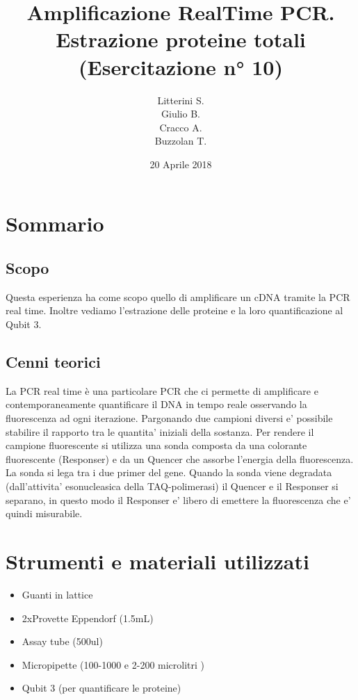 \documentclass{article}
\title{Amplificazione RealTime PCR. Estrazione proteine totali \\ (Esercitazione n° 10)} %
\author{Litterini S. \\Giulio B. \\Cracco A.\\Buzzolan T. } %
\date{20 Aprile 2018} %
\begin{document}
\maketitle


\section{Sommario}

\subsection{Scopo}


Questa esperienza ha come scopo quello di amplificare un cDNA tramite la PCR real time. Inoltre vediamo l'estrazione delle proteine e la loro quantificazione al Qubit 3.


\subsection{Cenni teorici}

La PCR real time è una particolare PCR che ci permette di amplificare e
contemporaneamente quantificare il DNA in tempo reale osservando la fluorescenza ad ogni iterazione.
Pargonando due campioni diversi e' possibile stabilire il rapporto tra le quantita' iniziali della sostanza.
Per rendere il campione fluorescente si utilizza una sonda composta da una colorante
fluorescente (Responser) e da un Quencer che assorbe l'energia della fluorescenza.
La sonda si lega tra i due primer del gene.
Quando la sonda viene degradata (dall'attivita' esonucleasica della TAQ-polimerasi)
il Quencer e il Responser si separano, in questo modo il Responser e' libero di emettere
la fluorescenza che e' quindi misurabile.

\section{Strumenti e materiali utilizzati}

\begin{itemize}
\item Guanti in lattice
\item 2xProvette Eppendorf (1.5mL)
\item Assay tube (500ul)
\item Micropipette (100-1000  e 2-200 microlitri  )
\item Qubit 3 (per quantificare le proteine)
\end{itemize}
\end{document}

